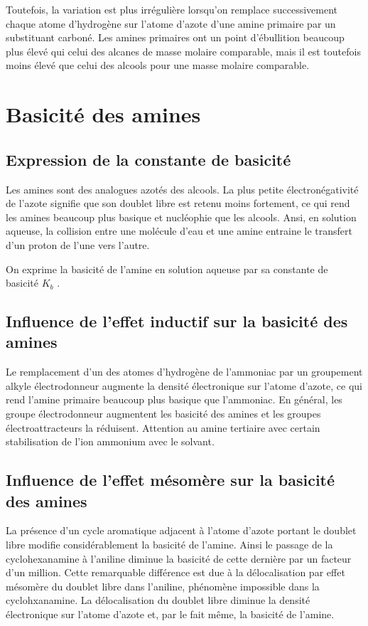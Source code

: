 Toutefois, la variation est plus irrégulière lorsqu'on remplace successivement chaque atome d'hydrogène sur l'atome d'azote d'une amine primaire par un substituant carboné.
Les amines primaires ont un point d'ébullition beaucoup plus élevé qui celui des alcanes de masse molaire comparable, mais il est toutefois moins élevé que celui des alcools pour une masse molaire comparable.

\section{Basicité des amines}

\subsection{Expression de la constante de basicité}

Les amines sont des analogues azotés des alcools.
La plus petite électronégativité de l'azote signifie que son doublet libre est retenu moins fortement, ce qui rend les amines beaucoup plus basique et nucléophie que les alcools.
Ansi, en solution aqueuse, la collision entre une molécule d'eau et une amine entraine le transfert d'un proton de l'une vers l'autre.


On exprime la basicité de l'amine en solution aqueuse par sa constante de basicité $K_b$ .

\subsection{Influence de l'effet inductif sur la basicité des amines}
Le remplacement d'un des atomes d'hydrogène de l'ammoniac par un groupement alkyle électrodonneur augmente la densité électronique sur l'atome d'azote, ce qui rend l'amine primaire beaucoup plus basique que l'ammoniac.
En général, les groupe électrodonneur augmentent les basicité des amines et les groupes électroattracteurs la réduisent.
Attention au amine tertiaire avec certain stabilisation de l'ion ammonium avec le solvant.



\subsection{Influence de l'effet mésomère sur la basicité des amines}

La présence d'un cycle aromatique adjacent à l'atome d'azote portant le doublet libre modifie considérablement la basicité de l'amine.
Ainsi le passage de la cyclohexanamine à l'aniline diminue la basicité de cette dernière par un facteur d'un million.
Cette remarquable différence est due à la délocalisation par effet mésomère du doublet libre dans l'aniline, phénomène impossible dans la cyclohxanamine.
La délocalisation du doublet libre diminue la densité électronique sur l'atome d'azote et, par le fait même, la basicité de l'amine.

